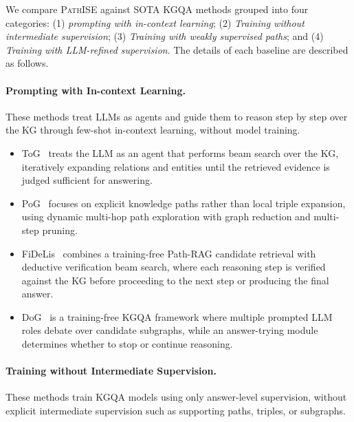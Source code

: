\documentclass{article}
\newcommand{\framework}{\textsc{PathISE}\xspace}
\begin{document}
We compare \framework against SOTA KGQA methods grouped into four categories:
(1) \textit{prompting with in-context learning};
(2) \textit{Training without intermediate supervision};
(3) \textit{Training with weakly supervised paths};
and (4) \textit{Training with LLM-refined supervision}. The details of each baseline are described as follows.

\paragraph{Prompting with In-context Learning.}
These methods treat LLMs as agents and guide them to reason step by step over the KG through few-shot in-context learning, without model training.

\begin{itemize}
    \item ToG~\citep{sun_tog_2024} treats the LLM as an agent that performs beam search over the KG, iteratively expanding relations and entities until the retrieved evidence is judged sufficient for answering.
    
    \item PoG~\citep{chen_pog_2024} focuses on explicit knowledge paths rather than local triple expansion, using dynamic multi-hop path exploration with graph reduction and multi-step pruning.
    
    \item FiDeLis~\citep{sui_fidelis_2025} combines a training-free Path-RAG candidate retrieval with deductive verification beam search, where each reasoning step is verified against the KG before proceeding to the next step or producing the final answer.

    \item DoG~\citep{ma_debate_2025} is a training-free KGQA framework where multiple prompted LLM roles debate over candidate subgraphs, while an answer-trying module determines whether to stop or continue reasoning.
    
\end{itemize}

\paragraph{Training without Intermediate Supervision.} These methods train KGQA models using only answer-level supervision, without explicit intermediate supervision such as supporting paths, triples, or subgraphs.
\end{document}
